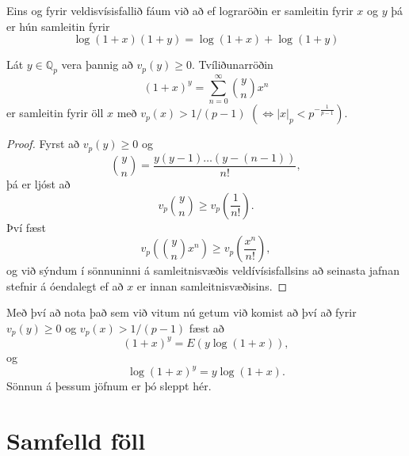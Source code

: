 Eins og fyrir veldisvísisfallið fáum við að ef lograröðin er samleitin fyrir $x$ og $y$ þá er hún samleitin fyrir 
\begin{equation*}
\log (1+x)(1+y) = \log(1+x) + \log(1+y)
\end{equation*} 

\begin{setn}
Lát $y\in \mathbb{Q}_p$ vera þannig að $v_p (y) \geq 0$. Tvíliðunarröðin 
\begin{equation*}
(1+x)^y = \sum_{n=0}^\infty \binom{y}{n}x^n
\end{equation*}
er samleitin fyrir öll $x$ með $v_p(x)>1/(p-1)$  $( \iff |x|_p <p^{-\frac{1}{p-1}})$.
\end{setn}
\begin{proof}
Fyrst að $v_p(y)\geq0$ og 
\begin{equation*}
\binom{y}{n} = \frac{y(y-1)\ldots (y-(n-1))}{n!},
\end{equation*}
þá er ljóst að
\begin{equation*}
v_p \binom{y}{n} \geq v_p \left( \frac{1}{n!} \right).
\end{equation*}
Því fæst
\begin{equation*}
v_p \left( \binom{y}{n} x^n \right) \geq v_p \left( \frac{x^n}{n!} \right),
\end{equation*}
og við sýndum í sönnuninni á samleitnisvæðis veldívísisfallsins að seinasta jafnan stefnir á óendalegt ef að $x$ er innan samleitnisvæðisins.
\end{proof}

Með því að nota það sem við vitum nú getum við komist að því að fyrir $v_p(y) \geq 0$ og $v_p(x) > 1/(p-1)$ fæst að
\begin{equation*}
(1+x)^y = E(y \log(1+x)),
\end{equation*}  
og 
\begin{equation*}
\log(1+x)^y = y \log(1+x).
\end{equation*}
Sönnun á þessum jöfnum er þó sleppt hér.
\section*{Samfelld föll}

